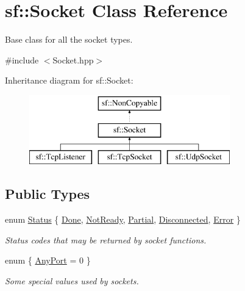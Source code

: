 \hypertarget{classsf_1_1_socket}{}\section{sf\+:\+:Socket Class Reference}
\label{classsf_1_1_socket}


Base class for all the socket types.  




{\ttfamily \#include $<$Socket.\+hpp$>$}

Inheritance diagram for sf\+:\+:Socket\+:\begin{figure}[H]
\begin{center}
\leavevmode
\includegraphics[height=3.000000cm]{classsf_1_1_socket}
\end{center}
\end{figure}
\subsection*{Public Types}
\begin{DoxyCompactItemize}
\item 
enum \hyperlink{classsf_1_1_socket_a51bf0fd51057b98a10fbb866246176dc}{Status} \{ \newline
\hyperlink{classsf_1_1_socket_a51bf0fd51057b98a10fbb866246176dca1de3a85bc56d3ae85b3d0f3cfd04ae90}{Done}, 
\hyperlink{classsf_1_1_socket_a51bf0fd51057b98a10fbb866246176dca8554848daae98f996e131bdeed076c09}{Not\+Ready}, 
\hyperlink{classsf_1_1_socket_a51bf0fd51057b98a10fbb866246176dca181c163fad2eaea927185d127c392706}{Partial}, 
\hyperlink{classsf_1_1_socket_a51bf0fd51057b98a10fbb866246176dcab215141f756acdc23c67fad149710eb1}{Disconnected}, 
\newline
\hyperlink{classsf_1_1_socket_a51bf0fd51057b98a10fbb866246176dca1dc9854433a28c22e192721179a2df5d}{Error}
 \}\begin{DoxyCompactList}\small\item\em Status codes that may be returned by socket functions. \end{DoxyCompactList}
\item 
enum \{ \hyperlink{classsf_1_1_socket_a478fc5d82347df37c24f10c32de8cca7a5a3c30fd128895403afc11076f461b19}{Any\+Port} = 0
 \}\begin{DoxyCompactList}\small\item\em Some special values used by sockets. \end{DoxyCompactList}
\end{DoxyCompactItemize}
